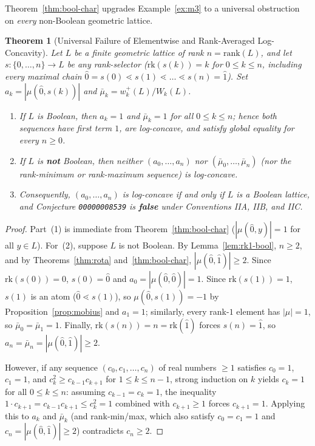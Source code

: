 \documentclass[11pt]{article}
\newtheorem{theorem}{Theorem}[section]
\theoremstyle{definition}
\theoremstyle{remark}
\newcommand{\rk}{\mathrm{rk}}
\newcommand{\hatzero}{\hat{0}}
\newcommand{\hatone}{\hat{1}}
\begin{document}
Theorem~\ref{thm:bool-char} upgrades Example~\ref{ex:m3} to a universal obstruction on \emph{every} non-Boolean geometric lattice.

\begin{theorem}[Universal Failure of Elementwise and Rank-Averaged Log-Concavity]
\label{thm:elem-universal}
Let $L$ be a finite geometric lattice of rank $n = \mathrm{rank}(L)$, and let $s : \{0,\dots,n\} \to L$ be any rank-selector ($\rk(s(k)) = k$ for $0 \le k \le n$, including every maximal chain $\hatzero = s(0) \lessdot s(1) \lessdot \dots \lessdot s(n) = \hatone$). Set $a_k = |\mu(\hatzero, s(k))|$ and $\bar{\mu}_k = w_k^+(L)/W_k(L)$.
\begin{enumerate}
  \item If $L$ is Boolean, then $a_k = 1$ and $\bar{\mu}_k = 1$ for all $0 \le k \le n$; hence both sequences have first term $1$, are log-concave, and satisfy global equality for every $n \ge 0$.
  \item If $L$ is \textbf{not} Boolean, then neither $(a_0,\dots,a_n)$ nor $(\bar{\mu}_0,\dots,\bar{\mu}_n)$ (nor the rank-minimum or rank-maximum sequence) is log-concave.
  \item Consequently, $(a_0,\dots,a_n)$ is log-concave if and only if $L$ is a Boolean lattice, and Conjecture \texttt{00000008539} is \textbf{false} under Conventions IIA, IIB, and IIC.
\end{enumerate}
\end{theorem}

\begin{proof}
Part~(1) is immediate from Theorem~\ref{thm:bool-char} ($|\mu(\hatzero, y)| = 1$ for all $y \in L$). For~(2), suppose $L$ is not Boolean. By Lemma~\ref{lem:rk1-bool}, $n \ge 2$, and by Theorems~\ref{thm:rota} and~\ref{thm:bool-char}, $|\mu(\hatzero, \hatone)| \ge 2$. Since $\rk(s(0)) = 0$, $s(0) = \hatzero$ and $a_0 = |\mu(\hatzero, \hatzero)| = 1$. Since $\rk(s(1)) = 1$, $s(1)$ is an atom ($\hatzero \lessdot s(1)$), so $\mu(\hatzero, s(1)) = -1$ by Proposition~\ref{prop:mobius} and $a_1 = 1$; similarly, every rank-$1$ element has $|\mu| = 1$, so $\bar{\mu}_0 = \bar{\mu}_1 = 1$. Finally, $\rk(s(n)) = n = \rk(\hatone)$ forces $s(n) = \hatone$, so $a_n = \bar{\mu}_n = |\mu(\hatzero, \hatone)| \ge 2$.

However, if any sequence $(c_0, c_1, \dots, c_n)$ of real numbers $\ge 1$ satisfies $c_0 = 1$, $c_1 = 1$, and $c_k^2 \ge c_{k-1} c_{k+1}$ for $1 \le k \le n - 1$, strong induction on $k$ yields $c_k = 1$ for all $0 \le k \le n$: assuming $c_{k-1} = c_k = 1$, the inequality $1 \cdot c_{k+1} = c_{k-1} c_{k+1} \le c_k^2 = 1$ combined with $c_{k+1} \ge 1$ forces $c_{k+1} = 1$. Applying this to $a_k$ and $\bar{\mu}_k$ (and rank-min/max, which also satisfy $c_0 = c_1 = 1$ and $c_n = |\mu(\hatzero,\hatone)| \ge 2$) contradicts $c_n \ge 2$.
\end{proof}
\end{document}
